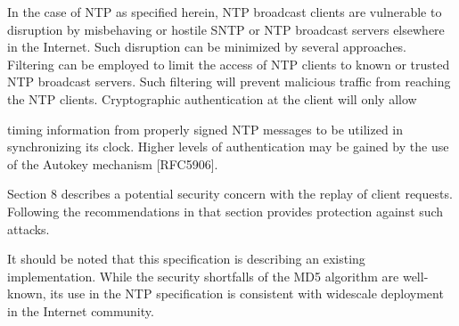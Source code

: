 In the case of NTP as specified herein, NTP broadcast clients are
vulnerable to disruption by misbehaving or hostile SNTP or NTP
broadcast servers elsewhere in the Internet.  Such disruption can be
minimized by several approaches.  Filtering can be employed to limit
the access of NTP clients to known or trusted NTP broadcast servers.
Such filtering will prevent malicious traffic from reaching the NTP
clients.  Cryptographic authentication at the client will only allow

timing information from properly signed NTP messages to be utilized
in synchronizing its clock.  Higher levels of authentication may be
gained by the use of the Autokey mechanism [RFC5906].

Section 8 describes a potential security concern with the replay of
client requests.  Following the recommendations in that section
provides protection against such attacks.

It should be noted that this specification is describing an existing
implementation.  While the security shortfalls of the MD5 algorithm
are well-known, its use in the NTP specification is consistent with
widescale deployment in the Internet community.
